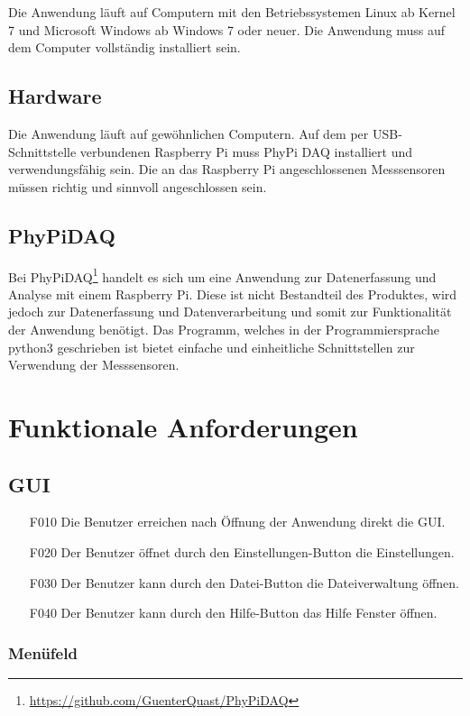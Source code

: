 \documentclass[parskip=full]{scrartcl}
\begin{document}
Die Anwendung läuft auf Computern mit den Betriebssystemen Linux ab Kernel 7 und Microsoft Windows ab Windows 7 oder neuer. Die Anwendung muss auf dem Computer vollständig installiert sein. 

\subsection{Hardware}

Die Anwendung läuft auf gewöhnlichen Computern.
Auf dem per USB-Schnittstelle verbundenen Raspberry Pi muss PhyPi DAQ installiert und verwendungsfähig sein.
Die an das Raspberry Pi angeschlossenen Messsensoren müssen richtig und sinnvoll angeschlossen sein.

\subsection{PhyPiDAQ}

Bei PhyPiDAQ\footnote{\url{https://github.com/GuenterQuast/PhyPiDAQ}} handelt es sich um eine Anwendung zur Datenerfassung und Analyse mit einem Raspberry Pi. Diese ist nicht Bestandteil des Produktes, wird jedoch zur Datenerfassung und Datenverarbeitung und somit zur Funktionalität der Anwendung  benötigt. Das Programm, welches in der Programmiersprache python3 geschrieben ist bietet einfache und einheitliche Schnittstellen zur Verwendung der Messsensoren.

\section{Funktionale Anforderungen}

\subsection{GUI}

\begin{itemize}
\item[F010] Die Benutzer erreichen nach Öffnung der Anwendung direkt die GUI.
\item[F020] Der Benutzer öffnet durch den Einstellungen-Button die Einstellungen.
\item[F030] Der Benutzer kann durch den Datei-Button die Dateiverwaltung öffnen.
\item[F040] Der Benutzer kann durch den Hilfe-Button das Hilfe Fenster öffnen.
\end{itemize}

\subsubsection{Menüfeld}
\end{document}
